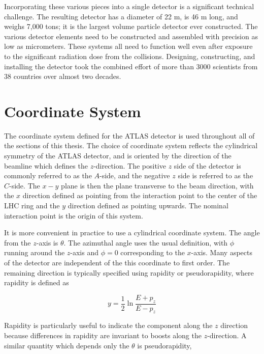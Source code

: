 Incorporating these various pieces into a single detector is a significant technical challenge.
The resulting detector has a diameter of 22 m, is 46 m long, and weighs 7,000 tons; it is the largest volume particle detector ever constructed.
The various detector elements need to be constructed and assembled with precision as low as micrometers.
These systems all need to function well even after exposure to the significant radiation dose from the collisions.
Designing, constructing, and installing the detector took the combined effort of more than 3000 scientists from 38 countries over almost two decades.


\section{Coordinate System}

The coordinate system defined for the \ac{ATLAS} detector is used throughout all of the sections of this thesis.
The choice of coordinate system reflects the cylindrical symmetry of the \ac{ATLAS} detector, and is oriented by the direction of the beamline which defines the $z$-direction.
The positive $z$ side of the detector is commonly referred to as the $A$-side, and the negative $z$ side is referred to as the $C$-side.
The $x-y$ plane is then the plane transverse to the beam direction, with the $x$ direction defined as pointing from the interaction point to the center of the \ac{LHC} ring and the $y$ direction defined as pointing upwards.
The nominal interaction point is the origin of this system.

It is more convenient in practice to use a cylindrical coordinate system.
The angle from the $z$-axis is $\theta$.
The azimuthal angle uses the usual definition, with $\phi$ running around the $z$-axis and $\phi = 0$ corresponding to the $x$-axis.
Many aspects of the detector are independent of the this coordinate to first order.
The remaining direction is typically specified using rapidity or pseudorapidity, where rapidity is defined as

\begin{equation}\label{eq:rapidity}
y = \frac{1}{2} \ln \frac{E + p_z}{E - p_z}
\end{equation}

\noindent Rapidity is particularly useful to indicate the component along the $z$ direction because differences in rapidity are invariant to boosts along the $z$-direction.
A similar quantity which depends only the $\theta$ is pseudorapidity, 

